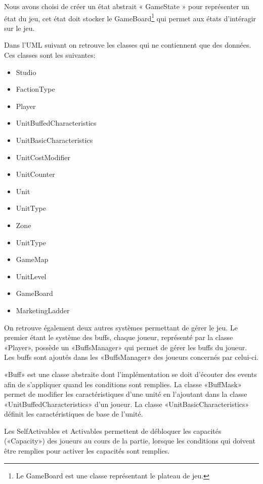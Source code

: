 Nous avons choisi de créer un état abstrait « GameState » pour
représenter un état du jeu, cet état doit stocker le GameBoard\footnote{Le GameBoard
  est une classe représentant le plateau de jeu.}
qui permet aux états d'intéragir sur le jeu.


Dans l'UML suivant on retrouve les classes qui ne contiennent que des données.
Ces classes sont les suivantes:
\begin{itemize}
    \item Studio
    \item FactionType
    \item Player
    \item UnitBuffedCharacteristics
    \item UnitBasicCharacteristics
    \item UnitCostModifier
    \item UnitCounter
    \item Unit
    \item UnitType
    \item Zone
    \item UnitType
    \item GameMap
    \item UnitLevel
    \item GameBoard
    \item MarketingLadder
\end{itemize}

On retrouve également deux autres systèmes permettant de gérer le jeu.
Le premier étant le système des buffs, chaque joueur, représenté par la classe
«Player», possède un «BuffsManager» qui permet de gérer les buffs du joueur.
Les buffs sont ajoutés dans les «BuffsManager» des joueurs concernés par
celui-ci.

«Buff» est une classe abstraite dont l'implémentation se doit d'écouter des events
afin de s'appliquer quand les conditions sont remplies.
La classe «BuffMask» permet de modifier les caractéristiques d'une unité en
l'ajoutant dans la classe «UnitBuffedCharacteristics» d'un joueur.
La classe «UnitBasicCharacteristics» définit les caractéristiques de base de l'unité.

Les SelfActivables et Activables permettent de débloquer les capacités («Capacity») des
joueurs au cours de la partie, lorsque les conditions qui doivent être remplies
pour activer les capacités sont remplies.



